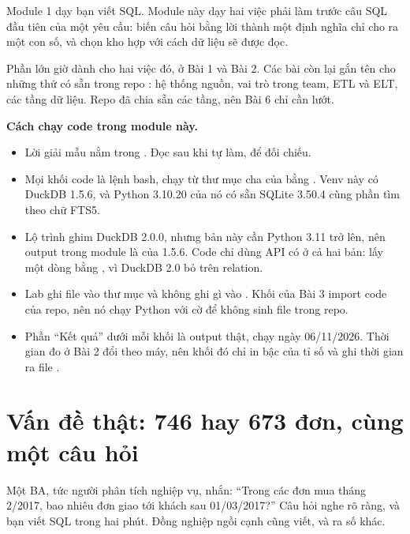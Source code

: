Module 1 dạy bạn viết SQL. Module này dạy hai việc phải làm trước câu SQL đầu tiên của một yêu cầu: biến câu hỏi bằng lời thành một định nghĩa chỉ cho ra một con số, và chọn kho hợp với cách dữ liệu sẽ được đọc.

Phần lớn giờ dành cho hai việc đó, ở Bài 1 và Bài 2. Các bài còn lại gắn tên cho những thứ có sẵn trong repo : hệ thống nguồn, vai trò trong team, ETL và ELT, các tầng dữ liệu. Repo  đã chia sẵn các tầng, nên Bài 6 chỉ cần lướt.

\begin{ghichu}
\textbf{Cách chạy code trong module này.}
\begin{itemize}
  \item Lời giải mẫu nằm trong . Đọc sau khi tự làm, để đối chiếu.
  \item Mọi khối code là lệnh bash, chạy từ thư mục cha của  bằng . Venv này có DuckDB 1.5.6, và Python 3.10.20 của nó có sẵn SQLite 3.50.4 cùng phần tìm theo chữ FTS5.
  \item Lộ trình ghim DuckDB 2.0.0, nhưng bản này cần Python 3.11 trở lên, nên output trong module là của 1.5.6. Code chỉ dùng API có ở cả hai bản: lấy một dòng bằng , vì DuckDB 2.0 bỏ  trên relation.
  \item Lab ghi file vào thư mục  và không ghi gì vào . Khối của Bài 3 import code của repo, nên nó chạy Python với cờ  để không sinh file  trong repo.
  \item Phần ``Kết quả'' dưới mỗi khối là output thật, chạy ngày 06/11/2026. Thời gian đo ở Bài 2 đổi theo máy, nên khối đó chỉ in bậc của tỉ số và ghi thời gian ra file .
\end{itemize}
\end{ghichu}

\section{Vấn đề thật: 746 hay 673 đơn, cùng một câu hỏi}

Một BA, tức người phân tích nghiệp vụ, nhắn: ``Trong các đơn mua tháng 2/2017, bao nhiêu đơn giao tới khách sau 01/03/2017?'' Câu hỏi nghe rõ ràng, và bạn viết SQL trong hai phút. Đồng nghiệp ngồi cạnh cũng viết, và ra số khác.


